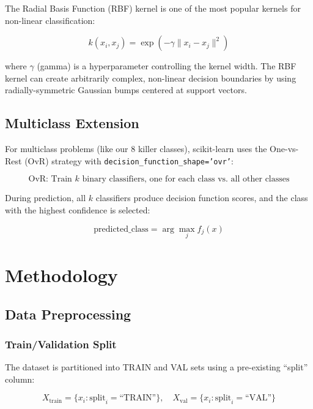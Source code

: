 \documentclass[12pt]{article}
\begin{document}
The Radial Basis Function (RBF) kernel is one of the most popular kernels for non-linear classification:

\begin{equation}
k(x_i, x_j) = \exp\left(-\gamma \|x_i - x_j\|^2\right)
\end{equation}

where $\gamma$ (gamma) is a hyperparameter controlling the kernel width. The RBF kernel can create arbitrarily complex, non-linear decision boundaries by using radially-symmetric Gaussian bumps centered at support vectors.

\subsection{Multiclass Extension}

For multiclass problems (like our 8 killer classes), scikit-learn uses the One-vs-Rest (OvR) strategy with \texttt{decision\_function\_shape='ovr'}:

\begin{equation}
\text{OvR: Train } k \text{ binary classifiers, one for each class vs. all other classes}
\end{equation}

During prediction, all $k$ classifiers produce decision function scores, and the class with the highest confidence is selected:

\begin{equation}
\text{predicted\_class} = \arg\max_{j} f_j(x)
\end{equation}

\section{Methodology}

\subsection{Data Preprocessing}

\subsubsection{Train/Validation Split}

The dataset is partitioned into TRAIN and VAL sets using a pre-existing ``split'' column:

\begin{equation}
X_{\text{train}} = \{x_i : \text{split}_i = \text{``TRAIN''}\}, \quad X_{\text{val}} = \{x_i : \text{split}_i = \text{``VAL''}\}
\end{equation}
\end{document}
